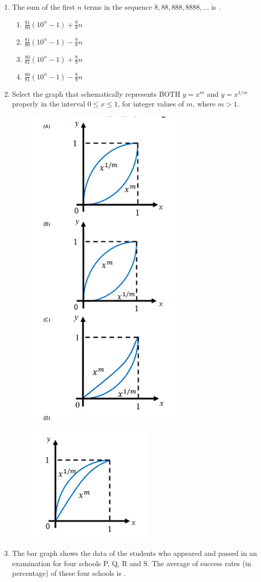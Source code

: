 \documentclass[journal,12pt,onecolumn]{IEEEtran}
\theoremstyle{remark}
\begin{document}
\begin{enumerate}
    \item The sum of the first $n$ terms in the sequence $8,88, 888, 8888,\dots$ is .
    
    \begin{enumerate}
        \item $ \frac{81}{80} (10^n - 1) + \frac{9}{8} n$
        \item $ \frac{81}{80} (10^n - 1) - \frac{9}{8} n$
        \item $ \frac{80}{81} (10^n - 1) + \frac{8}{9} n$
        \item $\frac{80}{81} (10^n - 1) - \frac{8}{9} n$
    \end{enumerate}
    
    
    \item Select the graph that schematically represents BOTH $y = x^m$ and $y = x^{1/m}$ properly in the interval $0 \leq x \leq 1$, for integer values of $m$, where $m > 1$.
    \begin{figure}[H]
    \centering
    \includegraphics[width=0.25\columnwidth]{fig/Q9(1).png}
     \caption*{}
    \label{fig:Q43}
\end{figure}
\begin{figure}[H]
    \centering
    \includegraphics[width=0.25\columnwidth]{fig/Q9(2).png}
     \caption*{}
    \label{fig:Q43}
\end{figure}
    \item The bar graph shows the data of the students who appeared and passed in an examination for four schools P, Q, R and S. The average of success rates (in percentage) of these four schools is \underline{\hspace{2cm}}.

\end{enumerate}
\end{document}
